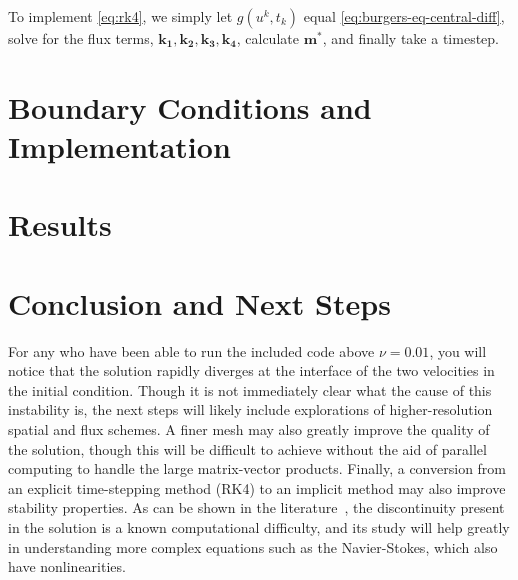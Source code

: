 \documentclass[11pt, letterpaper]{article}
\numberwithin{equation}{section}
\begin{document}
	To implement \cref{eq:rk4}, we simply let $g(u^k,t_k)$ equal \cref{eq:burgers-eq-central-diff}, solve for the flux terms, $\mathbf{k_1},\mathbf{k_2},\mathbf{k_3},\mathbf{k_4}$, calculate $\mathbf{m^*}$, and finally take a timestep.


	\section{Boundary Conditions and Implementation}\label{sec:boundary-conditions-and-implementation}
	


	\section{Results}\label{sec:results}
	


	\section{Conclusion and Next Steps}\label{sec:conclusion}
	For any who have been able to run the included code above $\nu=0.01$, you will notice that the solution rapidly diverges at the interface of the two velocities in the initial condition.
	Though it is not immediately clear what the cause of this instability is, the next steps will likely include explorations of higher-resolution spatial and flux schemes.
	A finer mesh may also greatly improve the quality of the solution, though this will be difficult to achieve without the aid of parallel computing to handle the large matrix-vector products.
	Finally, a conversion from an explicit time-stepping method (RK4) to an implicit method may also improve stability properties.
	As can be shown in the literature~\cite{cameronNOTESBURGERSEQUATION,salihBurgersEquation2016}, the discontinuity present in the solution is a known computational difficulty, and its study will help greatly in understanding more complex equations such as the Navier-Stokes, which also have nonlinearities.

	\appendix
\end{document}
